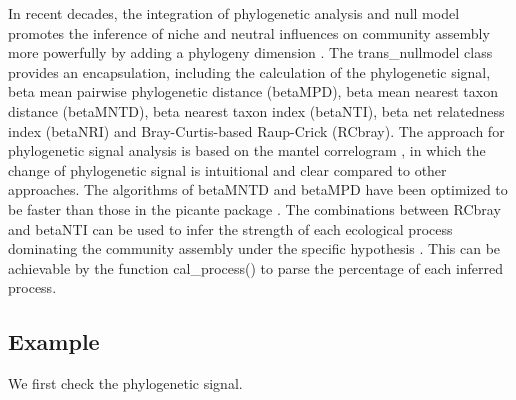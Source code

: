 \documentclass[
]{book}
\newenvironment{Shaded}{\begin{snugshade}}{\end{snugshade}}
\newcommand{\AttributeTok}[1]{\textcolor[rgb]{0.77,0.63,0.00}{#1}}
\newcommand{\CommentTok}[1]{\textcolor[rgb]{0.56,0.35,0.01}{\textit{#1}}}
\newcommand{\DecValTok}[1]{\textcolor[rgb]{0.00,0.00,0.81}{#1}}
\newcommand{\FunctionTok}[1]{\textcolor[rgb]{0.00,0.00,0.00}{#1}}
\newcommand{\NormalTok}[1]{#1}
\newcommand{\OtherTok}[1]{\textcolor[rgb]{0.56,0.35,0.01}{#1}}
\newcommand{\SpecialCharTok}[1]{\textcolor[rgb]{0.00,0.00,0.00}{#1}}
\newcommand{\StringTok}[1]{\textcolor[rgb]{0.31,0.60,0.02}{#1}}
\begin{document}
In recent decades,
the integration of phylogenetic analysis and null model promotes the inference of niche and neutral influences on community assembly more powerfully
by adding a phylogeny dimension \citep{Webb_Phylogenies_2002, Stegen_Quantifying_2013}.
The trans\_nullmodel class provides an encapsulation, including the calculation of the phylogenetic signal,
beta mean pairwise phylogenetic distance (betaMPD), beta mean nearest taxon distance (betaMNTD),
beta nearest taxon index (betaNTI), beta net relatedness index (betaNRI) and Bray-Curtis-based Raup-Crick (RCbray).
The approach for phylogenetic signal analysis is based on the mantel correlogram \citep{Liu_Long_term_2017},
in which the change of phylogenetic signal is intuitional and clear compared to other approaches.
The algorithms of betaMNTD and betaMPD have been optimized to be faster than those in the picante package \citep{Picante_Kembel_2010}.
The combinations between RCbray and betaNTI can be used to infer the strength of each ecological process dominating the community assembly
under the specific hypothesis \citep{Stegen_Quantifying_2013}.
This can be achievable by the function cal\_process() to parse the percentage of each inferred process.

\hypertarget{example-7}{%
\subsection{Example}\label{example-7}}

We first check the phylogenetic signal.

\begin{Shaded}
\end{Shaded}

\begin{Shaded}
\end{Shaded}
\end{document}
